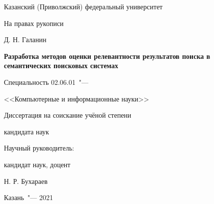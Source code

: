 \thispagestyle{empty}
\begin{center}
Казанский (Приволжский) федеральный университет
\end{center}
%
\vspace{0pt plus4fill} %
\begin{flushright}
На правах рукописи

\end{flushright}
%
\vspace{0pt plus6fill} %
\begin{center}
{\large Д. Н. Галанин}
\end{center}
%
\vspace{0pt plus1fill} %
\begin{center}
\textbf {\large %
Разработка методов оценки релевантности результатов поиска в семантических поисковых системах}

\vspace{0pt plus2fill} %
{%
Специальность 02.06.01\ "---

<<Компьютерные и информационные науки>>
}

\vspace{0pt plus2fill} %
Диссертация на соискание учёной степени

кандидата наук
\end{center}
%
\vspace{0pt plus4fill} %
\begin{flushright}

Научный руководитель:

кандидат наук, доцент

Н. Р. Бухараев

\end{flushright}
%
\vspace{0pt plus4fill} %
{\centering Казань\ "--- 2021\par}
\newpage